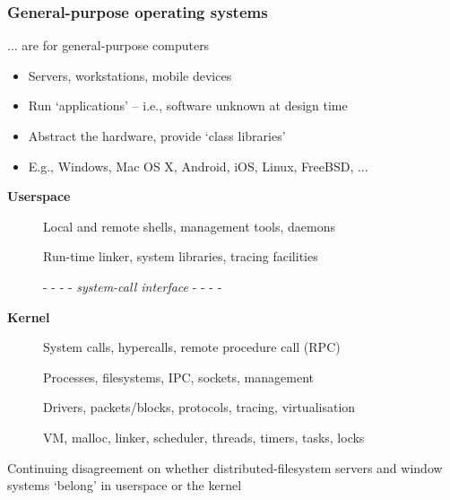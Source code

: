 \documentclass[pdftex]{beamer}
\begin{document}
\begin{frame}
  \frametitle{General-purpose operating systems}

  ...  are for general-purpose computers

  \begin{itemize}
    \item Servers, workstations, mobile devices
    \item Run `applications' -- i.e., software unknown at design time
    \item Abstract the hardware, provide `class libraries'
    \item E.g., Windows, Mac OS X, Android, iOS, Linux, FreeBSD, ...
  \end{itemize}

  \pause

  \medskip

  \begin{description}
    \item[\textbf{Userspace}]

      \smallskip

      Local and remote shells, management tools, daemons

      \smallskip

      Run-time linker, system libraries, tracing facilities

    \pause

    \item[] {\tiny - - - - \textit{system-call interface} - - - -}

    \pause

    \item[\textbf{Kernel}]

      System calls, hypercalls, remote procedure call (RPC)

      \smallskip

      Processes, filesystems, IPC, sockets, management

      \smallskip

      Drivers, packets/blocks, protocols, tracing, virtualisation

      \smallskip

      VM, malloc, linker, scheduler, threads, timers, tasks, locks

  \end{description}

  \pause

  \medskip

  Continuing disagreement on whether distributed-filesystem servers and
  window systems `belong' in userspace or the kernel
\end{frame}
\end{document}

